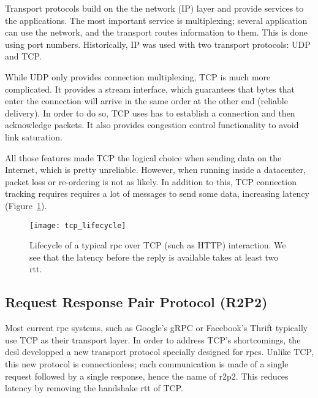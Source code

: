 Transport protocols build on the the network (IP) layer and provide services to the applications.
The most important service is multiplexing; several application can use the network, and the transport routes information to them.
This is done using port numbers.
Historically, IP was used with two transport protocols: UDP and TCP.

While UDP only provides connection multiplexing, TCP is much more complicated.
It provides a stream interface, which guarantees that bytes that enter the connection will arrive in the same order at the other end (reliable delivery).
In order to do so, TCP uses has to establish a connection and then acknowledge packets.
It also provides congestion control functionality to avoid link saturation.

All those features made TCP the logical choice when sending data on the Internet, which is pretty unreliable.
However, when running inside a datacenter, packet loss or re-ordering is not as likely.
In addition to this, TCP connection tracking requires requires a lot of messages to send some data, increasing latency (Figure~\ref{fig:tcp_lifecycle}).

%
%
%
%


\begin{figure}
    \centering
    \texttt{[image: tcp\_lifecycle]}
    \caption{Lifecycle of a typical \gls{rpc} over TCP (such as HTTP) interaction.
        We see that the latency before the reply is available takes at least two \gls{rtt}.
    \label{fig:tcp_lifecycle}
    }
\end{figure}


\subsection{Request Response Pair Protocol (R2P2)}

Most current \gls{rpc} systems, such as Google's gRPC\cite{grpc} or Facebook's Thrift\cite{thrift} typically use TCP as their transport layer.
In order to address TCP's shortcomings, the \gls{dcsl} developped a new transport protocol specially designed for \glspl{rpc}.
Unlike TCP, this new protocol is connectionless; each communication is made of a single request followed by a single response, hence the name of \gls{r2p2}.
This reduces latency by removing the handshake \gls{rtt} of TCP.

